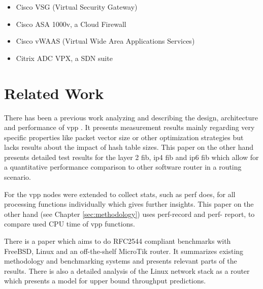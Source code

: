 \begin{itemize}
	\item Cisco VSG (Virtual Security Gateway)
	\item Cisco ASA 1000v, a Cloud Firewall
	\item Cisco vWAAS (Virtual Wide Area Applications Services)
	\item Citrix ADC VPX, a SDN suite
\end{itemize}


\chapter{Related Work}


There has been a previous work analyzing and describing the design,
architecture and performance of \Ac{vpp} \cite{linguaglossa2017high}.
It presents measurement results mainly regarding very specific
properties like packet vector size or other optimization strategies
but lacks results about the impact of hash table sizes. This paper on
the other hand presents detailed test results for the layer 2
\Ac{fib}, \Ac{ip4} \Ac{fib} and \Ac{ip6} \Ac{fib} which allow for a
quantitative performance comparison to other software router in a
routing scenario.


For \cite{linguaglossa2017high} the \Ac{vpp} nodes were extended to
collect stats, such as \Ac{perf} does, for all processing functions
individually which gives further insights. This paper on the other
hand (see Chapter \ref{sec:methodology}) uses perf-record and perf-
report, to compare used CPU time of \Ac{vpp} functions.



There is a paper \cite{revisiting-benchmarking:1} which aims to do
RFC2544 compliant benchmarks with FreeBSD, Linux and an off-the-shelf
MicroTik router. It summarizes existing methodology and benchmarking
systems and presents relevant parts of the results. There is also a
detailed analysis \cite{raumer2015performance} of the Linux network
stack as a router which presents a model for upper bound throughput
predictions.

